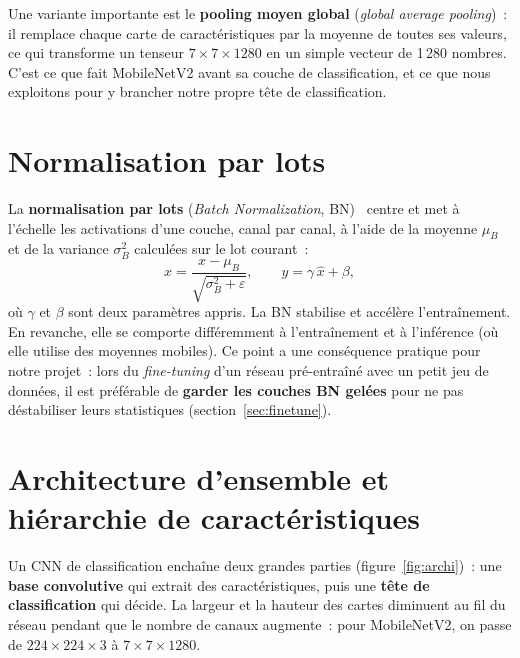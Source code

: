 Une variante importante est le \textbf{pooling moyen global} (\emph{global average pooling})~: il remplace chaque carte de caractéristiques par la moyenne de toutes ses valeurs, ce qui transforme un tenseur $7\times7\times1280$ en un simple vecteur de 1\,280 nombres. C’est ce que fait MobileNetV2 avant sa couche de classification, et ce que nous exploitons pour y brancher notre propre tête de classification.

\section{Normalisation par lots}

La \textbf{normalisation par lots} (\emph{Batch Normalization}, BN)~\cite{ioffe2015} centre et met à l’échelle les activations d’une couche, canal par canal, à l’aide de la moyenne $\mu_B$ et de la variance $\sigma_B^2$ calculées sur le lot courant~:
\begin{equation}
  \hat{x} = \frac{x-\mu_B}{\sqrt{\sigma_B^2+\varepsilon}}, \qquad y = \gamma\,\hat{x} + \beta,
\end{equation}
où $\gamma$ et $\beta$ sont deux paramètres appris. La BN stabilise et accélère l’entraînement. En revanche, elle se comporte différemment à l’entraînement et à l’inférence (où elle utilise des moyennes mobiles). Ce point a une conséquence pratique pour notre projet~: lors du \emph{fine-tuning} d’un réseau pré-entraîné avec un petit jeu de données, il est préférable de \textbf{garder les couches BN gelées} pour ne pas déstabiliser leurs statistiques (section~\ref{sec:finetune}).

\section{Architecture d’ensemble et hiérarchie de caractéristiques}

Un CNN de classification enchaîne deux grandes parties (figure~\ref{fig:archi})~: une \textbf{base convolutive} qui extrait des caractéristiques, puis une \textbf{tête de classification} qui décide. La largeur et la hauteur des cartes diminuent au fil du réseau pendant que le nombre de canaux augmente~: pour MobileNetV2, on passe de $224\times224\times3$ à $7\times7\times1280$.

